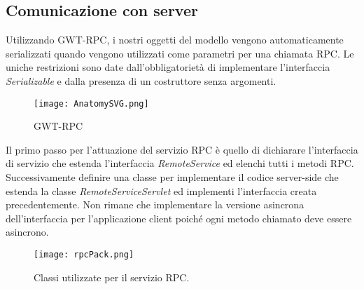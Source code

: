 \subsection{Comunicazione con server}
\FloatBarrier
Utilizzando GWT-RPC, i nostri oggetti del modello vengono automaticamente serializzati quando vengono utilizzati come parametri per una chiamata RPC. Le uniche restrizioni sono date dall’obbligatorietà di implementare 
l’interfaccia \emph{Serializable} e dalla presenza di un costruttore senza argomenti. 

\begin{figure}[!htb]
\centering%
\texttt{[image: AnatomySVG.png]}%
\caption{GWT-RPC }\label{fig:GWT-RPC}%
\end{figure}
\FloatBarrier
Il primo passo per l’attuazione del servizio RPC è quello di dichiarare l’interfaccia di servizio che estenda l’interfaccia \emph{RemoteService} ed elenchi tutti i metodi RPC.
Successivamente definire una classe per implementare il codice server-side che estenda la classe \emph{RemoteServiceServlet} ed implementi l’interfaccia creata precedentemente. 
Non rimane che implementare la versione asincrona dell'interfaccia per l’applicazione client poiché ogni metodo chiamato deve essere asincrono.

\begin{figure}[!htb]
\centering%
\texttt{[image: rpcPack.png]}%
\caption{Classi utilizzate per il servizio RPC. }\label{fig:RPCPack}%
\end{figure}